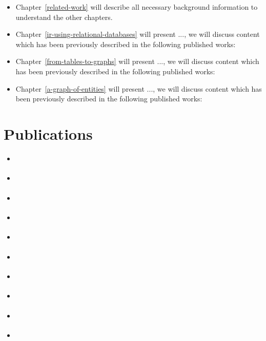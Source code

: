 \begin{itemize}
\item Chapter~\ref{related-work} will describe all necessary background information to understand the other chapters. 

\item Chapter~\ref{ir-using-relational-databases} will present ..., we will discuss content which has been previously described in the following published works: \cite{Kamphuis2020BM25, olddog-docker}

\item Chapter~\ref{from-tables-to-graphs} will present ..., we will discuss content which has been previously described in the following published works: \cite{need-graph-db, geesedb}

\item Chapter~\ref{a-graph-of-entities} will present ..., we will discuss content which has been previously described in the following published works: \cite{rebl}
\end{itemize}

\section{Publications}

\begin{itemize}
	\item \cite{olddog-docker}
	\item \cite{need-graph-db}
	\item \cite{trec-2019}
	\item \cite{ciff}	
	\item \cite{Kamphuis2020BM25}
	\item \cite{trec-2020}
	\item \cite{trec-covid}
	\item \cite{graphdb-for-ir}
	\item \cite{geesedb}
	\item \cite{rebl}
\end{itemize}
